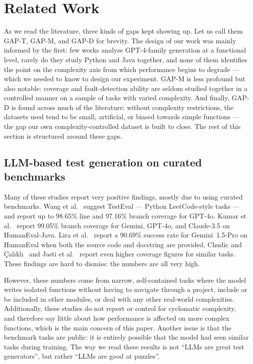 \section{Related Work}\label{sec:related}

As we read the literature, three kinds of gaps kept showing up. Let us call them GAP-T,
GAP-M, and GAP-D for brevity. The design of our work was mainly informed by the first:
few works analyse GPT-4-family generation at a functional level, rarely do they study
Python and Java together, and none of them identifies the point on the complexity axis
from which performance begins to degrade --- which we needed to know to design our
experiment. GAP-M is less profound but also notable: coverage and fault-detection
ability are seldom studied together in a controlled manner on a sample of tasks with
varied complexity. And finally, GAP-D is found across much of the literature: without
complexity restrictions, the datasets used tend to be small, artificial, or biased
towards simple functions --- the gap our own complexity-controlled dataset is built to
close. The rest of this section is structured around these gaps.

\subsection{LLM-based test generation on curated benchmarks}\label{sec:rel-curated}
Many of these studies report very positive findings, mostly due to using curated
benchmarks. Wang et al.~\cite{wang2025testeval} suggest TestEval --- Python
LeetCode-style tasks --- and report up to 98.65\% line and 97.16\% branch coverage for
GPT-4o. Kumar et al.~\cite{kumar2025empirical} report 99.05\% branch coverage for Gemini,
GPT-4o, and Claude-3.5 on HumanEval-Java. Lira et al.~\cite{lira2025evaluating} report a
90.69\% success rate for Gemini~1.5-Pro on HumanEval when both the source code and
docstring are provided. Chudic and
\c{C}al{\i}kl{\i}~\cite{chudic2026enhancement} and Jasti et al.~\cite{jasti2026feedback}
report even higher coverage figures for similar tasks. These findings are hard to
dismiss: the numbers are all very high.

However, these numbers come from narrow, self-contained tasks where the model writes
isolated functions without having to navigate through a project, include or be included
in other modules, or deal with any other real-world complexities. Additionally, these
studies do not report or control for cyclomatic complexity, and therefore say little
about how performance is affected on more complex functions, which is the main concern of
this paper. Another issue is that the benchmark tasks are public: it is entirely possible
that the model had seen similar tasks during training. The way we read these results is
not ``LLMs are great test generators'', but rather ``LLMs are good at puzzles''.

